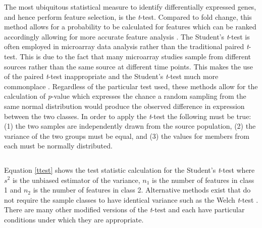 The most ubiquitous statistical measure to identify
differentially expressed genes, and hence perform feature selection, is the
\emph{t}-test.  Compared to fold change, this method allows for a probability
to be calculated for features which can be ranked accordingly allowing for more
accurate feature analysis \cite{PMID_164182572}. The Student's \emph{t}-test is
often employed in microarray data analysis rather than the traditional paired
\emph{t}-test.  This is due to the fact that many microarray studies sample
from different sources rather than the same source at different time points.
This makes the use of the paired \emph{t}-test inappropriate and the Student's
\emph{t}-test much more commonplace
\cite{ma2003gep,bueno2004dtp,PMID_14871811}. Regardless of the particular test
used, these methods allow for the calculation of \emph{p}-value which expresses
the chance a random sampling from the same normal distribution would produce
the observed difference in expression between the two classes. In order to
apply the \emph{t}-test the following must be true: (1) the two samples are
independently drawn from the source population, (2) the variance of the two
groups must be equal, and (3) the values for members from each must be normally
distributed.

\begin{equation} \label{ttest}
\end{equation}

Equation \eqref{ttest} shows the test statistic calculation for the Student's
\emph{t}-test where $s^2$ is the unbiased estimator of the variance, ${n}_1$ is
the number of features in class 1 and ${n}_2$ is the number of features in
class 2.  Alternative methods exist that do not require the sample classes to
have identical variance such as the Welch \emph{t}-test \cite{PMID_142249476}.
There are many other modified versions of the \emph{t}-test and each have
particular conditions under which they are appropriate.



